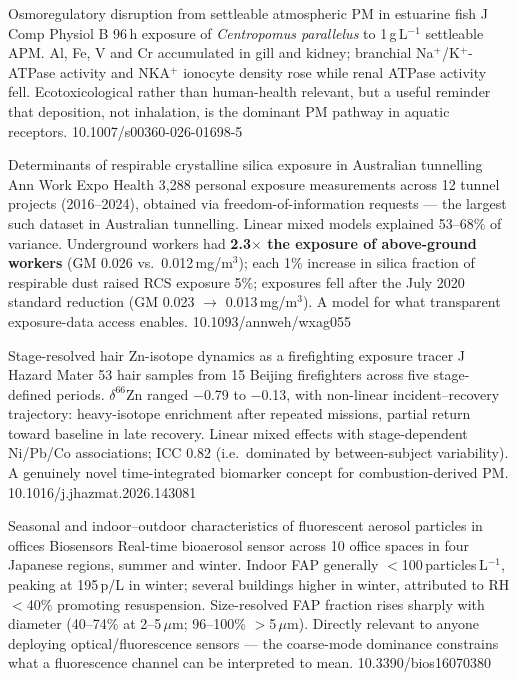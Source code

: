 \documentclass[10pt]{article}
\begin{document}
{Osmoregulatory disruption from settleable atmospheric PM in estuarine fish}
{J Comp Physiol B}
{96\,h exposure of \textit{Centropomus parallelus} to 1\,g\,L$^{-1}$ settleable APM.
Al, Fe, V and Cr accumulated in gill and kidney; branchial Na$^+$/K$^+$-ATPase activity
and NKA$^+$ ionocyte density rose while renal ATPase activity fell. Ecotoxicological
rather than human-health relevant, but a useful reminder that deposition, not
inhalation, is the dominant PM pathway in aquatic receptors.}
{10.1007/s00360-026-01698-5}


{Determinants of respirable crystalline silica exposure in Australian tunnelling}
{Ann Work Expo Health}
{3{,}288 personal exposure measurements across 12 tunnel projects (2016--2024), obtained
via freedom-of-information requests --- the largest such dataset in Australian tunnelling.
Linear mixed models explained 53--68\% of variance. Underground workers had
\textbf{2.3$\times$ the exposure of above-ground workers} (GM 0.026 vs.\ 0.012\,mg/m$^3$);
each 1\% increase in silica fraction of respirable dust raised RCS exposure 5\%;
exposures fell after the July 2020 standard reduction (GM 0.023 $\to$ 0.013\,mg/m$^3$).
A model for what transparent exposure-data access enables.}
{10.1093/annweh/wxag055}

{Stage-resolved hair Zn-isotope dynamics as a firefighting exposure tracer}
{J Hazard Mater}
{53 hair samples from 15 Beijing firefighters across five stage-defined periods.
$\delta^{66}$Zn ranged $-$0.79 to $-$0.13\permil, with non-linear
incident--recovery trajectory: heavy-isotope enrichment after repeated missions,
partial return toward baseline in late recovery. Linear mixed effects with stage-dependent
Ni/Pb/Co associations; ICC 0.82 (i.e.\ dominated by between-subject variability).
A genuinely novel time-integrated biomarker concept for combustion-derived PM.}
{10.1016/j.jhazmat.2026.143081}

{Seasonal and indoor--outdoor characteristics of fluorescent aerosol particles in offices}
{Biosensors}
{Real-time bioaerosol sensor across 10 office spaces in four Japanese regions, summer and
winter. Indoor FAP generally $<$100\,particles\,L$^{-1}$, peaking at 195\,p/L in winter;
several buildings higher in winter, attributed to RH$<$40\% promoting resuspension.
Size-resolved FAP fraction rises sharply with diameter (40--74\% at 2--5\,$\mu$m;
96--100\% $>$5\,$\mu$m). Directly relevant to anyone deploying optical/fluorescence
sensors --- the coarse-mode dominance constrains what a fluorescence channel can be
interpreted to mean.}
{10.3390/bios16070380}
\end{document}
